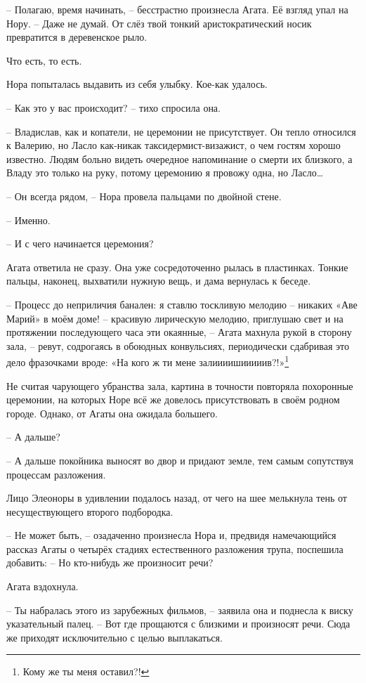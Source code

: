 \documentclass[
  a5paperpaper,
  DIV=11,
  numbers=noendperiod]{scrreprt}
\begin{document}
-- Полагаю, время начинать, -- бесстрастно произнесла Агата. Её взгляд
упал на Нору. -- Даже не думай. От слёз твой тонкий аристократический
носик превратится в деревенское рыло.

Что есть, то есть.

Нора попыталась выдавить из себя улыбку. Кое-как удалось.

-- Как это у вас происходит? -- тихо спросила она.

-- Владислав, как и копатели, не церемонии не присутствует. Он тепло
относился к Валерию, но Ласло как-никак таксидермист-визажист, о чем
гостям хорошо известно. Людям больно видеть очередное напоминание о
смерти их близкого, а Владу это только на руку, потому церемонию я
провожу одна, но Ласло\ldots{}

-- Он всегда рядом, -- Нора провела пальцами по двойной стене.

-- Именно.

-- И с чего начинается церемония?

Агата ответила не сразу. Она уже сосредоточенно рылась в пластинках.
Тонкие пальцы, наконец, выхватили нужную вещь, и дама вернулась к
беседе.

-- Процесс до неприличия банален: я ставлю тоскливую мелодию -- никаких
«Аве Марий» в моём доме! -- красивую лирическую мелодию, приглушаю свет
и на протяжении последующего часа эти окаянные, -- Агата махнула рукой в
сторону зала, -- ревут, содрогаясь в обоюдных конвульсиях, периодически
сдабривая это дело фразочками вроде: «На кого ж ти мене
залиииишииииив?!»\footnote{Кому же ты меня оставил?!}

Не считая чарующего убранства зала, картина в точности повторяла
похоронные церемонии, на которых Норе всё же довелось присутствовать в
своём родном городе. Однако, от Агаты она ожидала большего.

-- А дальше?

-- А дальше покойника выносят во двор и придают земле, тем самым
сопутствуя процессам разложения.

Лицо Элеоноры в удивлении подалось назад, от чего на шее мелькнула тень
от несуществующего второго подбородка.

-- Не может быть, -- озадаченно произнесла Нора и, предвидя намечающийся
рассказ Агаты о четырёх стадиях естественного разложения трупа,
поспешила добавить: -- Но кто-нибудь же произносит речи?

Агата вздохнула.

-- Ты набралась этого из зарубежных фильмов, -- заявила она и поднесла к
виску указательный палец. -- Вот где прощаются с близкими и произносят
речи. Сюда же приходят исключительно с целью выплакаться.
\end{document}
